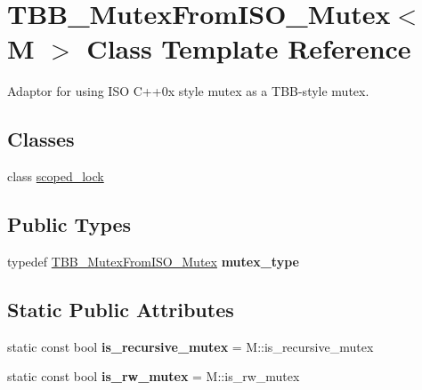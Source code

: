 \hypertarget{classTBB__MutexFromISO__Mutex}{}\section{T\+B\+B\+\_\+\+Mutex\+From\+I\+S\+O\+\_\+\+Mutex$<$ M $>$ Class Template Reference}
\label{classTBB__MutexFromISO__Mutex}


Adaptor for using I\+S\+O C++0x style mutex as a T\+B\+B-\/style mutex.  


\subsection*{Classes}
\begin{DoxyCompactItemize}
\item 
class \hyperlink{classTBB__MutexFromISO__Mutex_1_1scoped__lock}{scoped\+\_\+lock}
\end{DoxyCompactItemize}
\subsection*{Public Types}
\begin{DoxyCompactItemize}
\item 
\hypertarget{classTBB__MutexFromISO__Mutex_a6406cfd47333892e2e6b5948abd207ce}{}typedef \hyperlink{classTBB__MutexFromISO__Mutex}{T\+B\+B\+\_\+\+Mutex\+From\+I\+S\+O\+\_\+\+Mutex} {\bfseries mutex\+\_\+type}\label{classTBB__MutexFromISO__Mutex_a6406cfd47333892e2e6b5948abd207ce}

\end{DoxyCompactItemize}
\subsection*{Static Public Attributes}
\begin{DoxyCompactItemize}
\item 
\hypertarget{classTBB__MutexFromISO__Mutex_a57ea9235db6d11e793e2b98d1d4cd8f3}{}static const bool {\bfseries is\+\_\+recursive\+\_\+mutex} = M\+::is\+\_\+recursive\+\_\+mutex\label{classTBB__MutexFromISO__Mutex_a57ea9235db6d11e793e2b98d1d4cd8f3}

\item 
\hypertarget{classTBB__MutexFromISO__Mutex_a8b907f48f489bf34cd4f306a24a97a26}{}static const bool {\bfseries is\+\_\+rw\+\_\+mutex} = M\+::is\+\_\+rw\+\_\+mutex\label{classTBB__MutexFromISO__Mutex_a8b907f48f489bf34cd4f306a24a97a26}

\end{DoxyCompactItemize}
